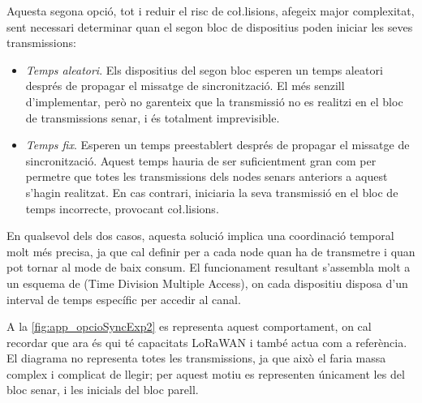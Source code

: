 \documentclass{tfgitic}[2024/07/01]
\begin{document}
{Aquesta segona opció, tot i reduir el risc de co\l.lisions, afegeix major complexitat, sent necessari determinar quan el segon bloc de dispositius poden iniciar les seves transmissions:
\begin{itemize}
    \item \emph{Temps aleatori}. Els dispositius del segon bloc esperen un temps aleatori després de propagar el missatge de sincronització. El més senzill d'implementar, però no garenteix que la transmissió no es realitzi en el bloc de transmissions senar, i és totalment imprevisible.
    \item \emph{Temps fix}. Esperen un temps preestablert després de propagar el missatge de sincronització. Aquest temps hauria de ser suficientment gran com per permetre que totes les transmissions dels nodes senars anteriors a aquest s'hagin realitzat. En cas contrari, iniciaria la seva transmissió en el bloc de temps incorrecte, provocant co\l.lisions.
\end{itemize}


En qualsevol dels dos casos, aquesta solució implica una coordinació temporal molt més precisa, ja que cal definir per a cada node quan ha de transmetre i quan pot tornar al mode de baix consum. El funcionament resultant s’assembla molt a un esquema de  (Time Division Multiple Access), on cada dispositiu disposa d’un interval de temps específic per accedir al canal.

A la \autoref{fig:app_opcioSyncExp2} es representa aquest comportament, on cal recordar que  ara és qui té capacitats LoRaWAN i també actua com a referència. El diagrama no representa totes les transmissions, ja que això el faria massa complex i complicat de llegir; per aquest motiu es representen únicament les del bloc senar, i les inicials del bloc parell.

}
\end{document}

